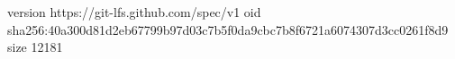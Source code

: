 version https://git-lfs.github.com/spec/v1
oid sha256:40a300d81d2eb67799b97d03c7b5f0da9cbc7b8f6721a6074307d3cc0261f8d9
size 12181
